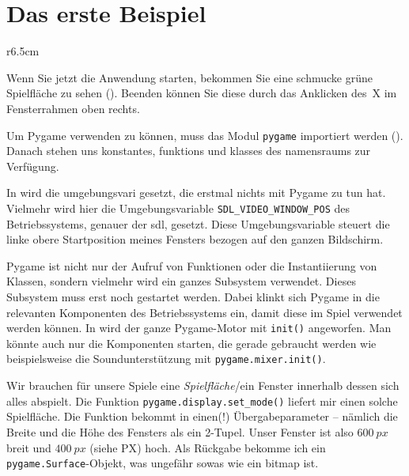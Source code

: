 \section{Das erste Beispiel}


\begin{wrapfigure}[11]{r}{6.5cm}
    \vspace{-1em}
\end{wrapfigure}
Wenn Sie jetzt die Anwendung starten, bekommen Sie eine schmucke grüne Spielfläche zu sehen (). Beenden können Sie diese durch das Anklicken des~X im Fensterrahmen oben rechts.


Um Pygame verwenden zu können, muss das Modul \texttt{pygame} importiert werden (). Danach stehen uns \glspl{konstante}, \glspl{funktion} und \glspl{klasse} des \Gls{namensraum}s zur Verfügung. 

In   wird die \Gls{umgebungsvari} gesetzt, die erstmal nichts mit Pygame zu tun hat. Vielmehr wird hier die Umgebungsvariable \texttt{SDL\_VIDEO\_WINDOW\_POS} des Betriebssystems, genauer der \Gls{sdl}, gesetzt. Diese Umgebungsvariable steuert die linke obere Startposition meines Fensters bezogen auf den ganzen Bildschirm. 

Pygame ist nicht nur der Aufruf von Funktionen oder die Instantiierung von Klassen, sondern vielmehr wird ein ganzes Subsystem verwendet. Dieses Subsystem muss erst noch gestartet werden. Dabei klinkt sich Pygame in die relevanten Komponenten des Betriebssystems ein, damit diese im Spiel verwendet werden können. In  wird der ganze Pygame-Motor mit \texttt{init()} angeworfen. Man könnte auch nur die Komponenten starten, die gerade gebraucht werden wie beispielsweise die Soundunterstützung mit \texttt{pygame.mixer.init()}.

Wir brauchen für unsere Spiele eine \emph{Spielfläche}/ein Fenster innerhalb dessen sich alles abspielt. Die Funktion \texttt{pygame.display.set\_mode()} liefert mir einen solche Spielfläche. Die Funktion bekommt in  einen(!) Übergabeparameter -- nämlich die Breite und die Höhe des Fensters als ein 2-Tupel. Unser Fenster ist also $600~px$ breit und $400~px$ (siehe \Gls{PX}) hoch. Als Rückgabe bekomme ich ein \texttt{pygame.Surface}-Objekt, was ungefähr sowas wie ein \Gls{bitmap} ist. 

